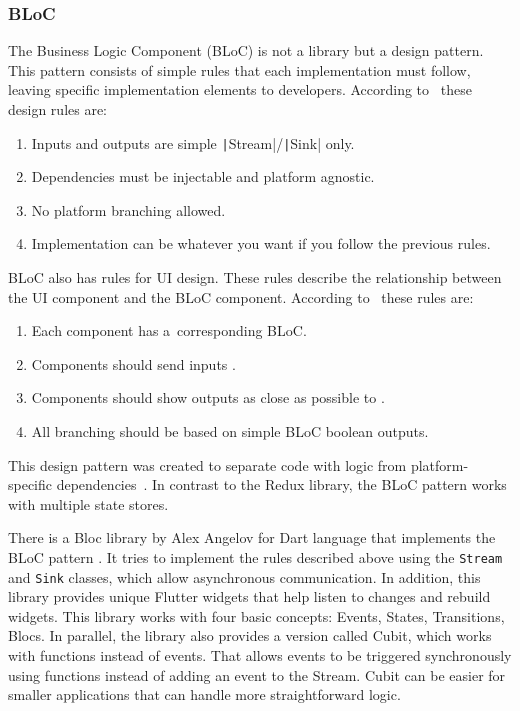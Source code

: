 \subsubsection{BLoC}

The Business Logic Component (BLoC) is not a library but a design pattern.
This pattern consists of simple rules that each implementation must follow, leaving specific implementation elements to developers.
According to~\cite{paolosoares_2018_flutter} these design rules are:

\begin{enumerate}
    \item Inputs and outputs are simple
    \texttt|Stream|/\texttt|Sink| only.
    \item Dependencies must be injectable and platform agnostic.
    \item No platform branching allowed.
    \item Implementation can be whatever you want
    if you follow the previous rules.
\end{enumerate}

BLoC also has rules for UI design.
These rules describe the relationship between the UI component and the BLoC component.
According to~\cite{paolosoares_2018_flutter} these rules are:

\begin{enumerate}
    \item Each  component has a~corresponding BLoC.
    \item Components should send inputs .
    \item Components should show outputs as close as possible to .
    \item All branching should be based on simple BLoC boolean outputs.
\end{enumerate}

This design pattern was created to separate code with logic
from platform-specific dependencies~\cite{paolosoares_2018_flutter}.
In contrast to the Redux library, the BLoC pattern works with multiple state stores.

There is a Bloc library by Alex Angelov for Dart language that implements the BLoC pattern \cite{angelov_2022_bloc}.
It tries to implement the rules described above using the \texttt{Stream} and \texttt{Sink} classes, which allow asynchronous communication.
In addition, this library provides unique Flutter widgets that help listen to changes and rebuild widgets.
This library works with four basic concepts: Events, States, Transitions, Blocs.
In parallel, the library also provides a version called Cubit, which works with functions instead of events.
That allows events to be triggered synchronously using functions instead of adding an event to the Stream.
Cubit can be easier for smaller applications that can handle more straightforward logic.

